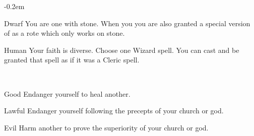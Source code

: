 \documentclass[8pt]{extarticle}
\begin{document}
\openup -0.2em

\charbanner

\begin{minipage}[t]{3.2in}

\begin{optfeature}{Dwarf}
  You are one with stone. When you  you are also granted
  a special version of  as a rote which
  only works on stone.
\end{optfeature}

\begin{optfeature}{Human}
  Your faith is diverse. Choose one Wizard spell. You can cast and be
  granted that spell as if it was a Cleric spell.
\end{optfeature}

\ 


\begin{optfeature}{Good}
  Endanger yourself to heal another.
\end{optfeature}

\begin{optfeature}{Lawful}
  Endanger yourself following the precepts of your church or god.
\end{optfeature}

\begin{optfeature}{Evil}
  Harm another to prove the superiority of your church or god.
\end{optfeature}


\ 



\vfill\null
\end{minipage}
\end{document}
